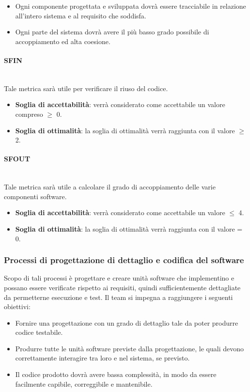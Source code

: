 \begin{itemize}
	\item Ogni componente progettata e sviluppata dovrà essere tracciabile in relazione all'intero sistema e al requisito che soddisfa.	
	\item Ogni parte del sistema dovrà avere il più basso grado possibile di accoppiamento ed alta coesione.
\end{itemize}

\paragraph{SFIN}
~\\Tale metrica sarà utile per verificare il riuso del codice.
\begin{itemize}
	\item \textbf{Soglia di accettabilità}: verrà considerato come accettabile un valore compreso $\ge$ 0.
	\item \textbf{Soglia di ottimalità}: la soglia di ottimalità verrà raggiunta con il valore $\ge$ 2.
\end{itemize}

\paragraph{SFOUT}
~\\Tale metrica sarà utile a calcolare il grado di accoppiamento delle varie componenti software.
\begin{itemize}
	\item \textbf{Soglia di accettabilità}: verrà considerato come accettabile un valore $\le$ 4.
	\item \textbf{Soglia di ottimalità}: la soglia di ottimalità verrà raggiunta con il valore = 0.
\end{itemize}


\subsubsection{Processi di progettazione di dettaglio e codifica del software}
Scopo di tali processi è progettare e creare unità software che implementino e possano essere verificate rispetto ai requisiti, quindi sufficientemente dettagliate da permetterne esecuzione e test.
Il team si impegna a raggiungere i seguenti obiettivi:

	\begin{itemize}
		\item Fornire una progettazione con un grado di dettaglio tale da poter produrre codice testabile.
		\item Produrre tutte le unità software previste dalla progettazione, le quali devono correttamente interagire tra loro e nel sistema, se previsto.
		\item Il codice prodotto dovrà avere bassa complessità, in modo da essere facilmente capibile, correggibile e mantenibile.
	\end{itemize}

